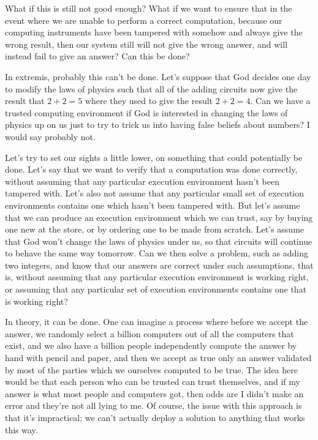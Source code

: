 \documentclass[11pt]{article}
\begin{document}
What if this is still not good enough? What if we want to ensure that in the event
where we are unable to perform a correct computation, because our computing
instruments have been tampered with somehow and always give the wrong result,
then our system still will not give the wrong answer, and will instead fail
to give an answer? Can this be done?

In extremis, probably this can't be done. Let's suppose that God decides one day
to modify the laws of physics such that all of the adding circuits now give
the result that $2+2=5$ where they used to give the result $2+2=4$. Can we have
a trusted computing environment if God is interested in changing the laws of physics
up on us just to try to trick us into having false beliefs about numbers? I would say
probably not.

Let's try to set our sights a little lower, on something that could potentially be done.
Let's say that we want to verify that a computation was done correctly, without
assuming that any particular execution environment hasn't been tampered with. Let's also
not assume that any particular small set of execution environments contains one which
hasn't been tampered with. But let's assume that we can produce an execution environment
which we can trust, say by buying one new at the store, or by ordering one to be made
from scratch. Let's assume that God won't change the laws of physics under us, so that
circuits will continue to behave the same way tomorrow. Can we then solve a problem,
such as adding two integers, and know that our answers are correct under such assumptions,
that is, without assuming that any particular execution environment is working right,
or assuming that any particular set of execution environments contains one that is
working right?

In theory, it can be done. One can imagine a process where before we accept the answer,
we randomly select a billion computers out of all the computers that exist, and we
also have a billion people independently compute the answer by hand with pencil and
paper, and then we accept as true only an answer validated by most of the parties
which we ourselves computed to be true. The idea here would be that each person who
can be trusted can trust themselves, and if my answer is what most people and computers
got, then odds are I didn't make an error and they're not all lying to me. Of course,
the issue with this approach is that it's impractical; we can't actually deploy a solution
to anything that works this way.
\end{document}
